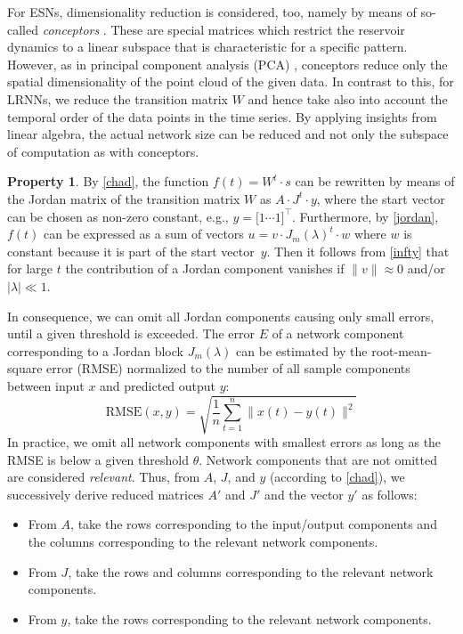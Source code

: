 \documentclass[twoside,11pt]{article}
\theoremstyle{definition}
\newtheorem{prop}{Property}
\begin{document}
For ESNs, dimensionality reduction is considered, too, namely by means of
so-called \emph{conceptors} \citep{Jae14,Jae17,KOS21b}. These are special matrices which
restrict the reservoir dynamics to a linear subspace that is characteristic for
a specific pattern. However, as in principal component analysis (PCA) \citep{Jol11}, conceptors
reduce only the spatial dimensionality of the point cloud of the given data. In
contrast to this, for LRNNs, we reduce the transition matrix $W$ and hence take
also into account the temporal order of the data points in the time series. By
applying insights from linear algebra, the actual network size can be reduced
and not only the subspace of computation as with conceptors.

\begin{prop}
By \cref{chad}, the function $f(t) = W^t \cdot s$ can be rewritten by
means of the Jordan matrix of the transition matrix $W$ as $A \cdot J^t
\cdot y$, where the start vector can be chosen as non-zero constant, e.g., $y =
\big[ 1 \cdots 1 \big]^\top$. Furthermore, by \cref{jordan}, $f(t)$ can be
expressed as a sum of vectors $u = v \cdot J_m(\lambda)^t \cdot w$ where $w$ is
constant because it is part of the start vector~$y$. Then it follows from
\cref{infty} that for large $t$ the contribution of a Jordan component
vanishes if $\|v\| \approx 0$ and/or $|\lambda| \ll 1$.

In consequence, we can omit all Jordan components causing only small errors,
until a given threshold is exceeded. The error $E$ of a network component
corresponding to a Jordan block $J_m(\lambda)$ can be estimated by the
root-mean-square error (RMSE) normalized to the number of all sample components
between input $x$ and predicted output $y$:
  \[ \mathrm{RMSE}(x,y) = \sqrt{\frac{1}{n} \sum_{t=1}^n \big\|x(t)-y(t)\big\|^2} \]
In practice, we omit all network components with smallest errors as long as the
RMSE is below a given threshold $\theta$. Network components that are not
omitted are considered \emph{relevant}. Thus, from $A$, $J$, and
$y$ (according to \cref{chad}), we successively derive reduced matrices
$A'$ and $J'$ and the vector $y'$ as follows:
\begin{itemize}
  \item From $A$, take the rows corresponding to the input/output components and
	the columns corresponding to the relevant network components.
  \item From $J$, take the rows and columns corresponding to the relevant
	network components.
  \item From $y$, take the rows corresponding to the relevant network
	components.
\end{itemize}
\end{prop}
\end{document}
